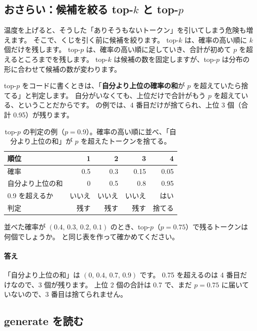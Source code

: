 \subsection*{おさらい：候補を絞る top-\texorpdfstring{$k$}{k} と top-\texorpdfstring{$p$}{p}}

温度を上げると、そうした「ありそうもないトークン」を引いてしまう危険も増えます。
そこで、くじを引く前に候補を絞ります。
top-$k$ は、確率の高い順に $k$ 個だけを残します。
top-$p$\cite{holtzman2020curious} は、確率の高い順に足していき、合計が初めて $p$ を超えるところまでを残します。
top-$k$ は候補の数を固定しますが、top-$p$ は分布の形に合わせて候補の数が変わります。

top-$p$ をコードに書くときは、「\textbf{自分より上位の確率の和}が $p$ を超えていたら捨てる」と判定します。
自分がいなくても、上位だけで合計がもう $p$ を超えている、ということだからです。
の例では、4 番目だけが捨てられ、上位 3 個（合計 0.95）が残ります。

\begin{table}[tbp]
\centering
\caption{top-$p$ の判定の例（$p=0.9$）。確率の高い順に並べ、「自分より上位の和」が $p$ を超えたトークンを捨てる。}
\label{tab:tf-topp}
\small
\begin{tabular}{lrrrr}
\toprule
順位 & 1 & 2 & 3 & 4 \\
\midrule
確率 & 0.5 & 0.3 & 0.15 & 0.05 \\
自分より上位の和 & 0 & 0.5 & 0.8 & 0.95 \\
0.9 を超えるか & いいえ & いいえ & いいえ & はい \\
判定 & 残す & 残す & 残す & 捨てる \\
\bottomrule
\end{tabular}
\end{table}

\begin{quiz}
並べた確率が $(0.4,\,0.3,\,0.2,\,0.1)$ のとき、top-$p$（$p=0.75$）で残るトークンは何個でしょうか。
と同じ表を作って確かめてください。
\end{quiz}

\paragraph{答え}
「自分より上位の和」は $(0,\,0.4,\,0.7,\,0.9)$ です。
0.75 を超えるのは 4 番目だけなので、3 個が残ります。
上位 2 個の合計は 0.7 で、まだ $p=0.75$ に届いていないので、3 番目は捨てられません。

\subsection*{generate を読む}

